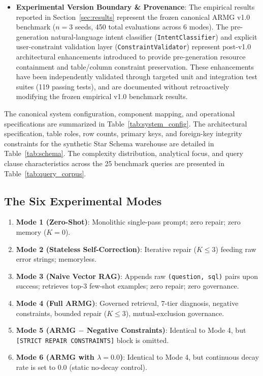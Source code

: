 \documentclass[conference]{IEEEtran}
\begin{document}
\begin{itemize}
    \item \textbf{Experimental Version Boundary \& Provenance}: The empirical results reported in Section~\ref{sec:results} represent the frozen canonical ARMG v1.0 benchmark ($n = 3$ seeds, 450 total evaluations across 6 modes). The pre-generation natural-language intent classifier (\texttt{IntentClassifier}) and explicit user-constraint validation layer (\texttt{ConstraintValidator}) represent post-v1.0 architectural enhancements introduced to provide pre-generation resource containment and table/column constraint preservation. These enhancements have been independently validated through targeted unit and integration test suites (119 passing tests), and are documented without retroactively modifying the frozen empirical v1.0 benchmark results.
\end{itemize}

The canonical system configuration, component mapping, and operational specifications are summarized in Table~\ref{tab:system_config}. The architectural specification, table roles, row counts, primary keys, and foreign-key integrity constraints for the synthetic Star Schema warehouse are detailed in Table~\ref{tab:schema}. The complexity distribution, analytical focus, and query clause characteristics across the 25 benchmark queries are presented in Table~\ref{tab:query_corpus}.





\subsection{The Six Experimental Modes}
\begin{enumerate}
    \item \textbf{Mode 1 (Zero-Shot)}: Monolithic single-pass prompt; zero repair; zero memory ($K=0$).
    \item \textbf{Mode 2 (Stateless Self-Correction)}: Iterative repair ($K \le 3$) feeding raw error strings; memoryless.
    \item \textbf{Mode 3 (Naive Vector RAG)}: Appends raw \texttt{(question, sql)} pairs upon success; retrieves top-3 few-shot examples; zero repair; zero governance.
    \item \textbf{Mode 4 (Full ARMG)}: Governed retrieval, 7-tier diagnosis, negative constraints, bounded repair ($K \le 3$), mutual-exclusion governance.
    \item \textbf{Mode 5 (ARMG $-$ Negative Constraints)}: Identical to Mode 4, but \texttt{[STRICT REPAIR CONSTRAINTS]} block is omitted.
    \item \textbf{Mode 6 (ARMG with $\lambda = 0.0$)}: Identical to Mode 4, but continuous decay rate is set to 0.0 (static no-decay control).
\end{enumerate}
\end{document}
